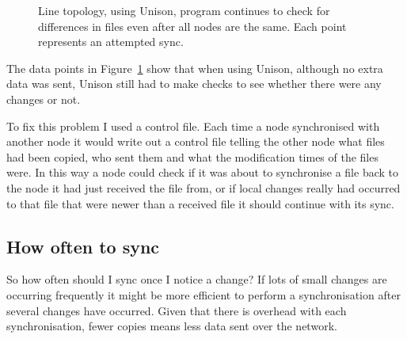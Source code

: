 \documentclass[12pt]{article}
\begin{document}

\begin{figure}[htp]
    \caption{Line topology, using Unison, program continues to check
    for differences in files even after all nodes are the same.
    Each point represents an attempted sync.}
    \label{fig:line_uni_tail_graph}
\end{figure}

The data points in Figure~\ref{fig:line_uni_tail_graph} show that when using
Unison, although no extra data was sent, Unison still had to make checks to see
whether there were any changes or not.

To fix this problem I used a control file. Each time a node
synchronised with another node it would write out a control file telling
the other node what files had been copied, who sent them and what the
modification times of the files were. In this way a node could check
if it was about to synchronise a file back to the node it had just received
the file from, or if local changes really had occurred to that file
that were newer than a received file it should continue with its sync.

\subsection{How often to sync}
So how often should I sync once I notice a change?
If lots of small changes are occurring frequently it might be more efficient
to perform a synchronisation after several changes have occurred. Given that
there is overhead with each synchronisation, fewer copies means less data
sent over the network.
\end{document}
